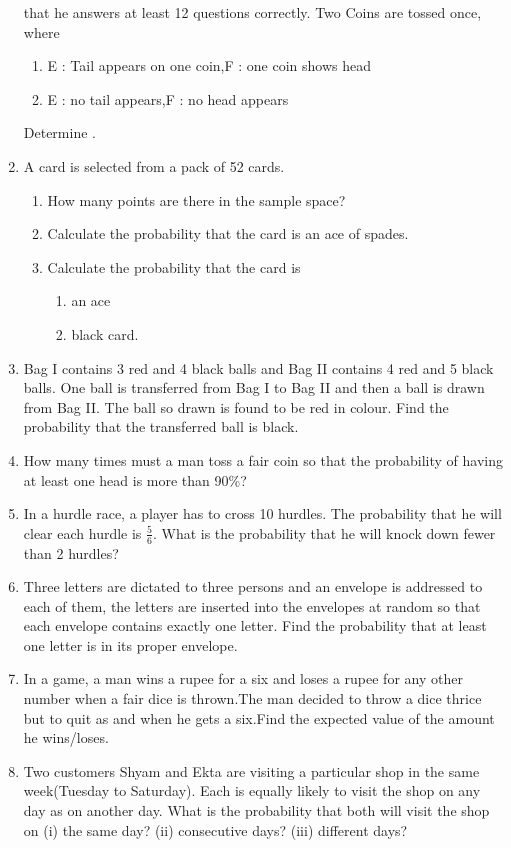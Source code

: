 \begin{enumerate}[label=\thechapter.\arabic*,ref=\thechapter.\theenumi]
        that he answers at least 12 questions correctly.
Two Coins are tossed once, where
\begin{enumerate}
\item  E : Tail appears on one coin,\qquad F : one coin shows head
\item  E : no tail appears,\qquad\qquad\qquad F : no head appears
\end{enumerate}
Determine .
\item A card is selected from a pack of 52 cards.
\begin{enumerate}
\item How many points are there in the sample space?
\item Calculate the probability that the card is an ace of spades.
\item Calculate the probability that the card is
           \begin{enumerate}
           \item an ace
           \item black card.
           \end{enumerate}
\end{enumerate}
\item Bag I contains 3 red and 4 black balls and Bag II contains 4 red and 5 black balls.
One ball is transferred from Bag I to Bag II and then a ball is drawn from Bag II.
The ball so drawn is found to be red in colour. Find the probability that the
transferred ball is black.
\item How many times must a man toss a fair coin so that the probability of having
at least one head is more than 90\%?
\item In a hurdle race, a player has to cross 10 hurdles. The probability that he will clear each hurdle is $\frac{5}{6}$. What is the probability that he will knock down fewer than 2 hurdles?
\item Three letters are dictated to three persons and an envelope is addressed to each
of them, the letters are inserted into the envelopes at random so that each envelope
contains exactly one letter. Find the probability that at least one letter is in its
proper envelope.
\item In a game, a man wins a rupee for a six and loses a rupee for any other number when a fair dice is thrown.The man decided to throw a dice thrice but to quit as and when he gets a six.Find the expected value of the amount he wins/loses.
\item Two customers Shyam and Ekta are visiting a particular shop in the same week(Tuesday to Saturday). Each is equally likely to visit the shop on any day as on another day. What is the probability that both will visit the shop on (i) the same day? (ii) consecutive days? (iii) different days?

\end{enumerate}
